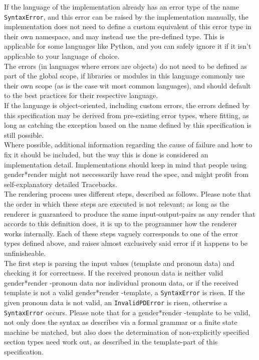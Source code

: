 \documentclass{article}
\newcommand{\GenderRender}{
    gender*render
}
\begin{document}
    If the language of the implementation already has an error type of the name \texttt{SyntaxError}, and this error can be raised by the implementation manually, the implementation does not need to define a custom equivalent of this error type in their own namespace, and may instead use the pre-defined type.
    This is applicable for some languages like Python, and you can safely ignore it if it isn't applicable to your language of choice.\\
    The errors (in languages where errors are objects) do not need to be defined as part of the global scope, if libraries or modules in this language commonly use their own scope (as is the case wit most common languages), and should default to the best practices for their respective language.\\
    If the language is object-oriented, including custom errors, the errors defined by this specification may be derived from pre-existing error types, where fitting, as long as catching the exception based on the name defined by this specification is still possible.\\
    Where possible, additional information regarding the cause of failure and how to fix it should be included, but the way this is done is considered an implementation detail.
    Implementations should keep in mind that people using \GenderRender might not neccessarily have read the spec, and might profit from self-explanatory detailed Tracebacks.\\

    The rendering process uses different steps, described as follows.
    Please note that the order in which these steps are executed is not relevant;
    as long as the renderer is guaranteed to produce the same input-output-pairs as any render that accords to this definition does, it is up to the programmer how the renderer works internally.
    Each of these steps vaguely corresponds to one of the error types defined above, and raises almost exclusively said error if it happens to be unfinisheable.\\

    The first step is parsing the input values (template and pronoun data) and checking it for correctness.
    If the received pronoun data is neither valid \GenderRender-pronoun data nor individual pronoun data, or if the received template is not a valid \GenderRender-template, a \texttt{SyntaxError} is risen.
    If the given pronoun data is not valid, an \texttt{InvalidPDError} is risen, otherwise a \texttt{SyntaxError} occurs.
    Please note that for a \GenderRender-template to be valid, not only does the syntax as describes via a formal grammar or a finite state machine be matched, but also does the determination of non-explicitly specified section types need work out, as described in the template-part of this specification.\\
\end{document}

